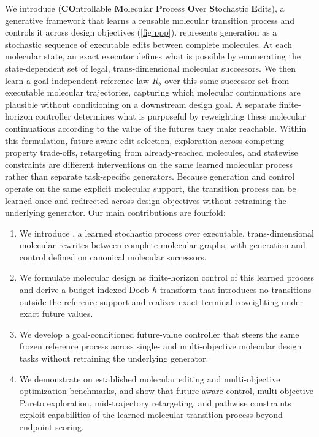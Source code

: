 We introduce \textbf{\method{}} (\textbf{CO}ntrollable \textbf{M}olecular \textbf{P}rocess \textbf{O}ver \textbf{S}tochastic \textbf{E}dits), a generative framework that learns a reusable molecular transition process and controls it across design objectives (\cref{fig:ppp}). \method{} represents generation as a stochastic sequence of executable edits between complete molecules. At each molecular state, an exact executor defines what is possible by enumerating the state-dependent set of legal, trans-dimensional molecular successors. We then learn a goal-independent reference law $R_\theta$ over this same successor set from executable molecular trajectories, capturing which molecular continuations are plausible without conditioning on a downstream design goal. A separate finite-horizon controller determines what is purposeful by reweighting these molecular continuations according to the value of the futures they make reachable. Within this formulation, future-aware edit selection, exploration across competing property trade-offs, retargeting from already-reached molecules, and statewise constraints are different interventions on the same learned molecular process rather than separate task-specific generators. Because generation and control operate on the same explicit molecular support, the transition process can be learned once and redirected across design objectives without retraining the underlying generator. Our main contributions are fourfold:


\begin{enumerate}[leftmargin=*,topsep=2pt,itemsep=1pt]
\item We introduce \method{}, a learned stochastic process over executable, trans-dimensional molecular rewrites between complete molecular graphs, with generation and control defined on canonical molecular successors.
\item We formulate molecular design as finite-horizon control of this learned process and derive a budget-indexed Doob $h$-transform that introduces no transitions outside the reference support and realizes exact terminal reweighting under exact future values.
\item We develop a goal-conditioned future-value controller that steers the same frozen reference process across single- and multi-objective molecular design tasks without retraining the underlying generator.
\item We demonstrate \method{} on established molecular editing and multi-objective optimization benchmarks, and show that future-aware control, multi-objective Pareto exploration, mid-trajectory retargeting, and pathwise constraints exploit capabilities of the learned molecular transition process beyond endpoint scoring.
\end{enumerate}
